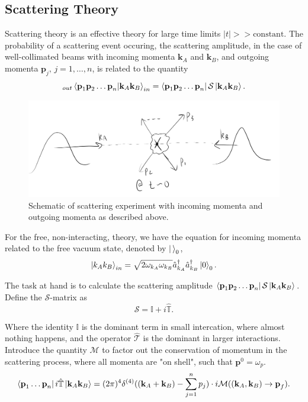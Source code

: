 \subsection*{Scattering Theory}

\noindent Scattering theory is an effective theory for large time limits $|t| >> \text{constant}$. The probability of a scattering event occuring, the scattering amplitude, in the case of well-collimated beams with incoming momenta $\textbf{k}_A$ and $\textbf{k}_B$, and outgoing momenta $\textbf{p}_j, \, j=1,\dots,n$, is related to the quantity
\begin{equation}
_{out}\braket{\textbf{p}_1 \textbf{p}_2 \dots \textbf{p}_n | \textbf{k}_A \textbf{k}_B}_{in} = \bra{\textbf{p}_1 \textbf{p}_2 \dots \textbf{p}_n} \mathcal{S} \ket{\textbf{k}_A \textbf{k}_B} .
\end{equation}

\begin{figure}[H]
	\centering
	\includegraphics[scale=0.4]{scattering.png}
	\caption{Schematic of scattering experiment with incoming momenta and outgoing momenta as described above.}
\end{figure}

\noindent For the free, non-interacting, theory, we have the equation for incoming momenta related to the free vacuum state, denoted by $\ket{\,}_0$,
\begin{equation}
\ket{k_A k_B}_{in} = \sqrt{2 \omega_{k_A} \omega_{k_B}} \hat{a}_{k_A}^\dagger \hat{a}_{k_B}^\dagger \ket{0}_0 .
\end{equation}

\noindent The task at hand is to calculate the scattering amplitude $\bra{\textbf{p}_1 \textbf{p}_2 \dots \textbf{p}_n} \mathcal{S} \ket{\textbf{k}_A \textbf{k}_B}$. Define the $\mathcal{S}$-matrix as
\begin{equation}
\mathcal{S} = \mathbb{I} + i \hat{\mathbb{T}}.
\end{equation}

\noindent Where the identity $\mathbb{I}$ is the dominant term in small intercation, where almost nothing happens, and the operator $\hat{\mathcal{T}}$ is the dominant in larger interactions. Introduce the quantity $\mathcal{M}$ to factor out the conservation of momentum in the scattering process, where all momenta are "on shell", such that $\textbf{p}^0 = \omega_p$. 
\begin{equation}
\bra{\textbf{p}_1 \dots \textbf{p}_n} i\hat{\mathbb{T}} \ket{\textbf{k}_A \textbf{k}_B} = (2\pi)^4 \delta^{(4)}((\textbf{k}_A + \textbf{k}_B) - \sum_{j=1}^{n} p_j) \cdot i \mathcal{M}((\textbf{k}_A, \textbf{k}_B) \to \textbf{p}_f).
\end{equation}

